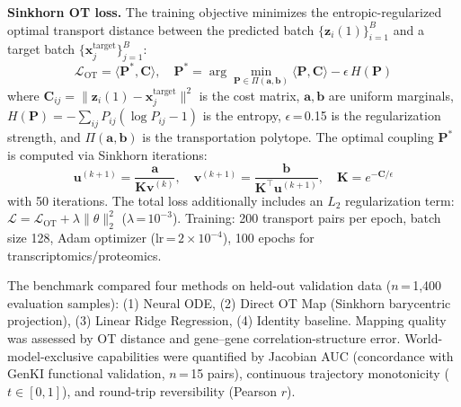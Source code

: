 \documentclass[12pt,a4paper]{article}
\begin{document}
\textbf{Sinkhorn OT loss.} The training objective minimizes the entropic-regularized optimal transport distance between the predicted batch $\{\mathbf{z}_i(1)\}_{i=1}^B$ and a target batch $\{\mathbf{x}_j^{\text{target}}\}_{j=1}^B$:
\begin{equation}
\mathcal{L}_{\text{OT}} = \langle \mathbf{P}^*, \mathbf{C} \rangle, \quad \mathbf{P}^* = \arg\min_{\mathbf{P} \in \Pi(\mathbf{a},\mathbf{b})} \langle \mathbf{P}, \mathbf{C} \rangle - \epsilon \, H(\mathbf{P})
\end{equation}
where $\mathbf{C}_{ij} = \|\mathbf{z}_i(1) - \mathbf{x}_j^{\text{target}}\|^2$ is the cost matrix, $\mathbf{a},\mathbf{b}$ are uniform marginals, $H(\mathbf{P}) = -\sum_{ij} P_{ij}(\log P_{ij} - 1)$ is the entropy, $\epsilon$\,=\,0.15 is the regularization strength, and $\Pi(\mathbf{a},\mathbf{b})$ is the transportation polytope. The optimal coupling $\mathbf{P}^*$ is computed via Sinkhorn iterations:
\begin{equation}
\mathbf{u}^{(k+1)} = \frac{\mathbf{a}}{\mathbf{K}\mathbf{v}^{(k)}}, \quad \mathbf{v}^{(k+1)} = \frac{\mathbf{b}}{\mathbf{K}^\top\mathbf{u}^{(k+1)}}, \quad \mathbf{K} = e^{-\mathbf{C}/\epsilon}
\end{equation}
with 50 iterations. The total loss additionally includes an $L_2$ regularization term: $\mathcal{L} = \mathcal{L}_{\text{OT}} + \lambda \|\theta\|_2^2$ ($\lambda$\,=\,$10^{-3}$). Training: 200 transport pairs per epoch, batch size 128, Adam optimizer (lr\,=\,$2 \times 10^{-4}$), 100 epochs for transcriptomics/proteomics.

The benchmark compared four methods on held-out validation data ($n$\,=\,1{,}400 evaluation samples): (1) Neural ODE, (2) Direct OT Map (Sinkhorn barycentric projection), (3) Linear Ridge Regression, (4) Identity baseline. Mapping quality was assessed by OT distance and gene--gene correlation-structure error. World-model-exclusive capabilities were quantified by Jacobian AUC (concordance with GenKI functional validation, $n$\,=\,15 pairs), continuous trajectory monotonicity ($t \in [0,1]$), and round-trip reversibility (Pearson $r$).
\end{document}
